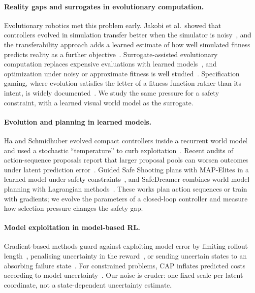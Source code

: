 \documentclass[sigconf,dvipsnames]{acmart}
\begin{document}
\paragraph{Reality gaps and surrogates in evolutionary computation.}
Evolutionary robotics met this problem early. Jakobi et al.\ showed that
controllers evolved in simulation transfer better when the simulator is
noisy~\cite{jakobi1995noise}, and the transferability approach adds a
learned estimate of how well simulated fitness predicts reality as a further
objective~\cite{koos2013transferability}. Surrogate-assisted evolutionary
computation replaces expensive evaluations with learned
models~\cite{jin2011surrogate}, and optimization under noisy or approximate
fitness is well studied~\cite{jin2005uncertain}. Specification gaming, where
evolution satisfies the letter of a fitness function rather than its intent, is
widely documented~\cite{lehman2020surprising}. We study the same pressure for a
safety constraint, with a learned visual world model as the surrogate.

\paragraph{Evolution and planning in learned models.}
Ha and Schmidhuber evolved compact controllers inside a recurrent world model
and used a stochastic ``temperature'' to curb exploitation~\cite{ha2018worldmodels}.
Recent audits of action-sequence proposals report that larger proposal pools can
worsen outcomes under latent prediction error~\cite{li2026asar}. Guided Safe
Shooting plans with MAP-Elites in a learned model under safety
constraints~\cite{paolo2022guss}, and SafeDreamer combines world-model planning
with Lagrangian methods~\cite{huang2024safedreamer}. These works plan action
sequences or train with gradients; we evolve the parameters of a closed-loop
controller and measure how selection pressure changes the safety gap.

\paragraph{Model exploitation in model-based RL.}
Gradient-based methods guard against exploiting model error by limiting rollout
length~\cite{janner2019mbpo}, penalising uncertainty in the
reward~\cite{yu2020mopo}, or sending uncertain states to an absorbing failure
state~\cite{kidambi2020morel}. For constrained problems, CAP inflates predicted
costs according to model uncertainty~\cite{ma2022cap}. Our noise is cruder: one
fixed scale per latent coordinate, not a state-dependent uncertainty estimate.
\end{document}
